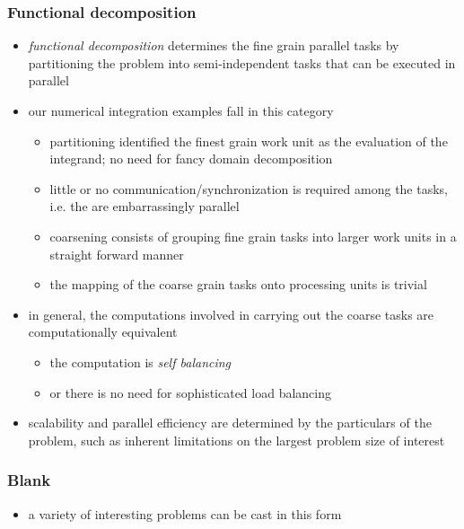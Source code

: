%
%
%
%


\begin{frame}[fragile]
%
  \frametitle{Functional decomposition}
%
  \begin{itemize}
%
  \item {\em functional decomposition} determines the fine grain parallel tasks by partitioning
    the problem into semi-independent tasks that can be executed in parallel
%
  \item our numerical integration examples fall in this category
    \begin{itemize}
    \item partitioning identified the finest grain work unit as the evaluation of the
      integrand; no need for fancy domain decomposition
    \item little or no communication/synchronization is required among the tasks, i.e. the are
      embarrassingly parallel
    \item coarsening consists of grouping fine grain tasks into larger work units in a straight
      forward manner
    \item the mapping of the coarse grain tasks onto processing units is trivial
    \end{itemize}
%
  \item in general, the computations involved in carrying out the coarse tasks are
    computationally equivalent
    \begin{itemize}
    \item the computation is {\em self balancing}
    \item or there is no need for sophisticated load balancing
    \end{itemize}
%
  \item scalability and parallel efficiency are determined by the particulars of the problem,
    such as inherent limitations on the largest problem size of interest
%
  \end{itemize}
%
\end{frame}

\begin{frame}[fragile]
%
  \frametitle{Blank}
%
  \begin{itemize}
%
  \item a variety of interesting problems can be cast in this form
%
  \end{itemize}
%
\end{frame}


